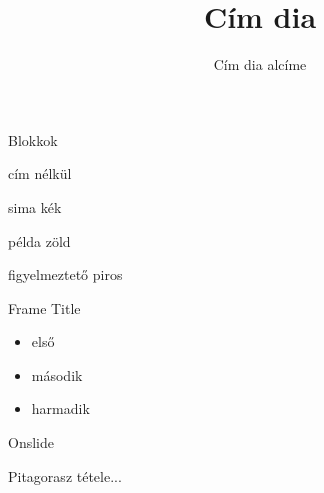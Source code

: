 \documentclass[aspectratio=169, bigger, xcolor=table]{beamer}
\begin{document}
    \begin{frame}
        \title{Cím dia}
        \subtitle{Cím dia alcíme}
        
        \maketitle
    \end{frame}

    \begin{frame}{Blokkok}
        \begin{block}
            cím nélkül
        \end{block}
        
        \pause
        
        \begin{block}{sima}
            kék
        \end{block}
        
        \pause
        
        \begin{exampleblock}{példa}
            zöld
        \end{exampleblock}
        
        \pause
        
        \begin{alertblock}{figyelmeztető}
            piros
        \end{alertblock}
    \end{frame}
    
    \begin{frame}{Frame Title}
        \begin{itemize}
            \item<3-> első
            \item<2-> második
            \item<1-> harmadik
        \end{itemize}
    \end{frame}
    
    \begin{frame}{Onslide}
        \begin{theorem}
            Pitagorasz tétele...
        \end{theorem}
        
    \end{frame}
    
\end{document}
